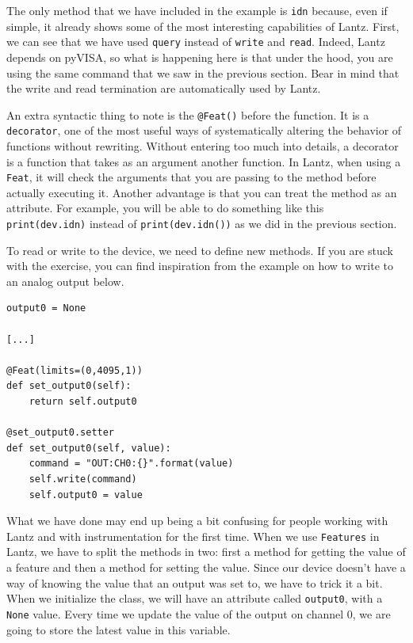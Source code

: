The only method that we have included in the example is \texttt{idn} because, even if simple, it already shows some of the most interesting
capabilities of Lantz. First, we can see that we have used \texttt{query} instead of \texttt{write} and \texttt{read}. Indeed, Lantz depends on pyVISA, so what is happening here is that under the hood, you are using the same command that we saw in the previous section. Bear in mind that the write and read termination are automatically used by Lantz. 

An extra syntactic thing to note is the \texttt{@Feat()} before the function. It is a \texttt{decorator}, one of the most useful ways of systematically altering the behavior of functions without rewriting. Without entering too much into details, a decorator is a function that takes as an argument another function. In Lantz, when using a \texttt{Feat}, it will check the arguments that you are passing to the method before actually executing it. Another advantage is that you can treat the method as an attribute. For example, you will be able to do something like this \texttt{print(dev.idn)} instead of \texttt{print(dev.idn())} as we did in the previous section.


To read or write to the device, we need to define new methods. If you are stuck with the exercise, you can find inspiration from the example on how to write to an analog output below.

\begin{verbatim}
output0 = None

[...]

@Feat(limits=(0,4095,1))
def set_output0(self):
    return self.output0

@set_output0.setter
def set_output0(self, value):
    command = "OUT:CH0:{}".format(value)
    self.write(command)
    self.output0 = value
\end{verbatim}

What we have done may end up being a bit confusing for people working with Lantz and with instrumentation for the first time. When we use \texttt{Features} in Lantz, we have to split the methods in two: first a method for getting the value of a feature and then a method for setting the value. Since our device doesn't have a way of knowing the value that an output was set to, we have to trick it a bit. When we initialize the class, we will have an attribute called \texttt{output0}, with a \texttt{None} value. Every time we update the value of the output on channel 0, we are going to store the latest value in this variable.

